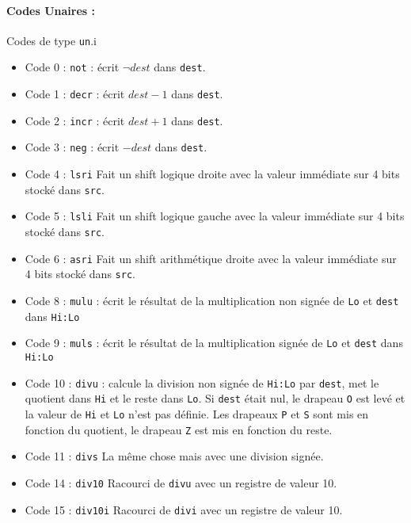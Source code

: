 \documentclass[12pt]{article}
\begin{document}
\paragraph{Codes Unaires :} Codes de type \verb!un!.i
\begin{itemize}
\item Code 0 : \verb!not! : écrit $\neg dest$ dans \verb!dest!.
\item Code 1 : \verb!decr! : écrit $dest-1$ dans \verb!dest!.
\item Code 2 : \verb!incr! : écrit $dest +1$ dans \verb!dest!.
\item Code 3 : \verb!neg! : écrit $ - dest$ dans \verb!dest!.
\item Code 4 : \verb!lsri! Fait un shift logique droite avec la valeur immédiate
  sur 4 bits stocké dans \verb!src!.
\item Code 5 : \verb!lsli! Fait un shift logique gauche avec la valeur immédiate
  sur 4 bits stocké dans \verb!src!.
\item Code 6 : \verb!asri! Fait un shift arithmétique droite avec la valeur immédiate
  sur 4 bits stocké dans \verb!src!.

\item Code 8 : \verb!mulu! : écrit le résultat de la multiplication non signée de
  \verb!Lo! et \verb!dest! dans \verb!Hi:Lo! 
\item Code 9 : \verb!muls! : écrit le résultat de la multiplication signée de
  \verb!Lo! et \verb!dest! dans \verb!Hi:Lo! 
\item Code 10 : \verb!divu! : calcule la division non signée de \verb!Hi:Lo! par
  \verb!dest!, met le quotient dans \verb!Hi! et le reste dans \verb!Lo!. Si
  \verb!dest! était nul, le drapeau \verb!O! est levé et la valeur de
  \verb!Hi! et \verb!Lo! n'est pas définie.
  Les drapeaux \verb!P! et \verb!S! sont mis en fonction du quotient, le
  drapeau \verb!Z! est mis en fonction du reste.
\item Code 11 : \verb!divs! La même chose mais avec une division signée.
\item Code 14 : \verb!div10! Racourci de \verb!divu! avec un registre de valeur 10.
\item Code 15 : \verb!div10i! Racourci de \verb!divi! avec un registre de valeur 10.
\end{itemize}
\end{document}
